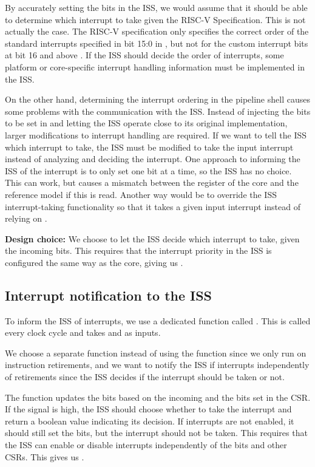 By accurately setting the  bits in the ISS, we would assume that it should be able to determine which interrupt to take given the RISC-V Specification.
This is not actually the case. The RISC-V specification only specifies the correct order of the standard interrupts specified in bit 15:0 in , but not for the custom interrupt bits at bit 16 and above \cite{watermanRISCVInstructionSet2021}. If the ISS should decide the order of interrupts, some platform or core-specific interrupt handling information must be implemented in the ISS.

On the other hand, determining the interrupt ordering in the pipeline shell causes some problems with the communication with the ISS. Instead of injecting the bits to be set in  and letting the ISS operate close to its original implementation, larger modifications to interrupt handling are required. If we want to tell the ISS which interrupt to take, the ISS must be modified to take the input interrupt instead of analyzing  and deciding the interrupt. One approach to informing the ISS of the interrupt is to only set one  bit at a time, so the ISS has no choice. This can work, but causes a mismatch between the  register of the core and the reference model if this is read. Another way would be to override the ISS interrupt-taking functionality so that it takes a given input interrupt instead of relying on .

\textbf{Design choice:} We choose to let the ISS decide which interrupt to take, given the incoming  bits. This requires that the interrupt priority in the ISS is configured the same way as the core, giving us \textbf{}.

\subsection{Interrupt notification to the ISS}

To inform the ISS of interrupts, we use a dedicated function called . This is called every clock cycle and takes  and  as inputs.

We choose a separate function instead of using the  function since we only run  on instruction retirements, and we want to notify the ISS if interrupts independently of retirements since the ISS decides if the interrupt should be taken or not.

The  function updates the  bits based on the incoming  and the bits set in the  CSR. If the  signal is high, the ISS should choose whether to take the interrupt and return a boolean value indicating its decision. If interrupts are not enabled, it should still set the  bits, but the interrupt should not be taken. This requires that the ISS can enable or disable interrupts independently of the  bits and other CSRs. This gives us . 



